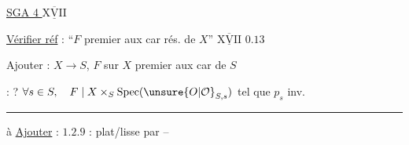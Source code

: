 
\uline{SGA 4 $\underline{\overline{\mathrm{XVII}}}$}

\uline{Vérifier réf} : ``$F$ premier aux car rés. de $X$''
\quad $\underline{\overline{\mathrm{XVII}}}$ $0.13$

Ajouter : $X\longrightarrow S$, \quad $F$ sur $X$ premier aux car de  $S$

: ? $\forall s\in S,\quad F\mid X\times_S\mathrm{Spec}(\unsure{O|\mathcal O}_{S,s})$ tel que $p_s$ inv.

\smallskip\hfil\rule{.10\linewidth}{.35pt}\hfil

à \uline{Ajouter} : $1.2.9$ : plat/lisse par  --


